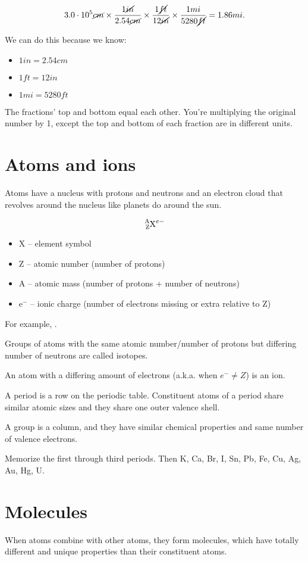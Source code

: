 \documentclass[letterpaper, 12pt]{article}
\begin{document}
	$$3.0 \cdot 10^5 \cancel{cm} \times \frac{1 \cancel{in}}{2.54 \cancel{cm}} \times \frac{1 \cancel{ft}}{12 \cancel{in}} \times \frac{1 mi}{5280 \cancel{ft}} = 1.86 mi.$$
	
	We can do this because we know:
	\begin{itemize}
		\item $1 in = 2.54 cm$
		\item $1 ft = 12 in$
		\item $1 mi = 5280 ft$
	\end{itemize}
	The fractions' top and bottom equal each other. You're multiplying the original number by 1, except the top and bottom of each fraction are in different units.
	
\section{Atoms and ions}
Atoms have a nucleus with protons and neutrons and an electron cloud that revolves around the nucleus like planets do around the sun.

$$\ce{^{A}_{Z}X^{e-}}$$

\begin{itemize}
	\item X -- element symbol
	\item Z -- atomic number (number of protons)
	\item A -- atomic mass (number of protons + number of neutrons)
	\item e$^{-}$ -- ionic charge (number of electrons missing or extra relative to Z)
\end{itemize}

For example, .

Groups of atoms with the same atomic number/number of protons but differing number of neutrons are called isotopes.

An atom with a differing amount of electrons (a.k.a. when $e^{-} \neq Z$) is an ion.

A period is a row on the periodic table. Constituent atoms of a period share similar atomic sizes and they share one outer valence shell.

A group is a column, and they have similar chemical properties and same number of valence electrons.

Memorize the first through third periods. Then K, Ca, Br, I, Sn, Pb, Fe, Cu, Ag, Au, Hg, U.

\section{Molecules}
When atoms combine with other atoms, they form molecules, which have totally different and unique properties than their constituent atoms.
\end{document}
